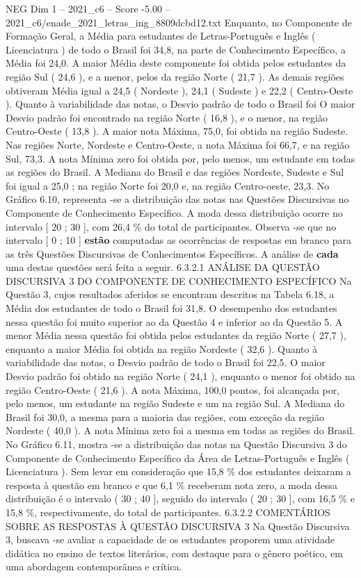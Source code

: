 \begin{textsample}{NEG Dim 1 – 2021\_c6 – Score -5.00 – 2021\_c6/enade\_2021\_letras\_ing\_8809dcbd12.txt}
Enquanto, no Componente de Formação Geral, a Média para estudantes de Letras-Português e Inglês ( Licenciatura ) de todo o Brasil foi 34,8, na parte de Conhecimento Específico, a Média foi 24,0.
A maior Média deste componente foi obtida pelos estudantes da região Sul ( 24,6 ), e a menor, pelos da região Norte ( 21,7 ).
As demais regiões obtiveram Média igual a 24,5 ( Nordeste ), 24,1 ( Sudeste ) e 22,2 ( Centro-Oeste ).
Quanto à variabilidade das notas, o Desvio padrão de todo o Brasil foi O maior Desvio padrão foi encontrado na região Norte ( 16,8 ), e o menor, na região Centro-Oeste ( 13,8 ).
A maior nota Máxima, 75,0, foi obtida na região Sudeste.
Nas regiões Norte, Nordeste e Centro-Oeste, a nota Máxima foi 66,7, e na região Sul, 73,3.
A nota Mínima zero foi obtida por, pelo menos, um estudante em todas as regiões do Brasil.
A Mediana do Brasil e das regiões Nordeste, Sudeste e Sul foi igual a 25,0 ; na região Norte foi 20,0 e, na região Centro-oeste, 23,3.
No Gráfico 6.10, representa -se a distribuição das notas nas Questões Discursivas no Componente de Conhecimento Específico.
A moda dessa distribuição ocorre no intervalo [ 20 ; 30 ], com 26,4 \% do total de participantes.
Observa -se que no intervalo [ 0 ; 10 ] \textbf{estão} computadas as ocorrências de respostas em branco para as três Questões Discursivas de Conhecimentos Específicos.
A análise de \textbf{cada} uma destas questões será feita a seguir. 6.3.2.1 ANÁLISE DA QUESTÃO DISCURSIVA 3 DO COMPONENTE DE CONHECIMENTO ESPECÍFICO Na Questão 3, cujos resultados aferidos se encontram descritos na Tabela 6.18, a Média dos estudantes de todo o Brasil foi 31,8.
O desempenho dos estudantes nessa questão foi muito superior ao da Questão 4 e inferior ao da Questão 5.
A menor Média nessa questão foi obtida pelos estudantes da região Norte ( 27,7 ), enquanto a maior Média foi obtida na região Nordeste ( 32,6 ).
Quanto à variabilidade das notas, o Desvio padrão de todo o Brasil foi 22,5.
O maior Desvio padrão foi obtido na região Norte ( 24,1 ), enquanto o menor foi obtido na região Centro-Oeste ( 21,6 ).
A nota Máxima, 100,0 pontos, foi alcançada por, pelo menos, um estudante na região Sudeste e um na região Sul.
A Mediana do Brasil foi 30,0, a mesma para a maioria das regiões, com exceção da região Nordeste ( 40,0 ).
A nota Mínima zero foi a mesma em todas as regiões do Brasil.
No Gráfico 6.11, mostra -se a distribuição das notas na Questão Discursiva 3 do Componente de Conhecimento Específico da Área de Letras-Português e Inglês ( Licenciatura ).
Sem levar em consideração que 15,8 \% dos estudantes deixaram a resposta à questão em branco e que 6,1 \% receberam nota zero, a moda dessa distribuição é o intervalo ( 30 ; 40 ], seguido do intervalo ( 20 ; 30 ], com 16,5 \% e 15,8 \%, respectivamente, do total de participantes. 6.3.2.2 COMENTÁRIOS SOBRE AS RESPOSTAS À QUESTÃO DISCURSIVA 3 Na Questão Discursiva 3, buscava -se avaliar a capacidade de os estudantes proporem uma atividade didática no ensino de textos literários, com destaque para o gênero poético, em uma abordagem contemporânea e crítica.

\end{textsample}

